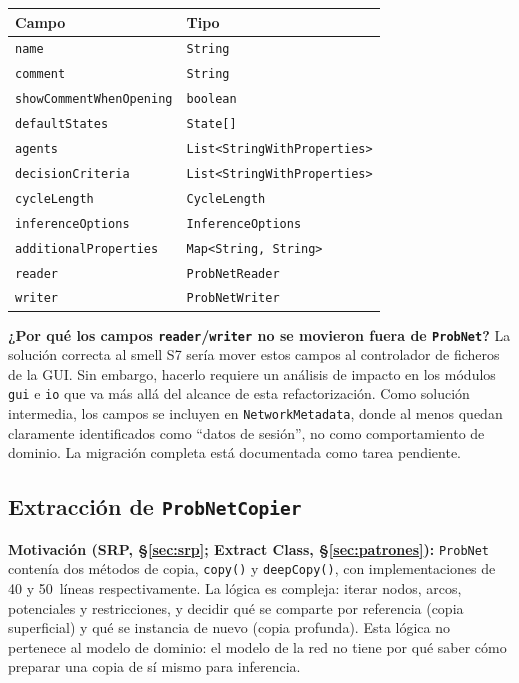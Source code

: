\documentclass[11pt,a4paper]{article}
\newcommand{\code}[1]{\texttt{#1}}
\begin{document}
\begin{center}
\begin{tabular}{ll}
\toprule
\textbf{Campo} & \textbf{Tipo} \\
\midrule
\code{name}                      & \code{String} \\
\code{comment}                   & \code{String} \\
\code{showCommentWhenOpening}    & \code{boolean} \\
\code{defaultStates}             & \code{State[]} \\
\code{agents}                    & \code{List<StringWithProperties>} \\
\code{decisionCriteria}          & \code{List<StringWithProperties>} \\
\code{cycleLength}               & \code{CycleLength} \\
\code{inferenceOptions}          & \code{InferenceOptions} \\
\code{additionalProperties}      & \code{Map<String, String>} \\
\code{reader}                    & \code{ProbNetReader} \\
\code{writer}                    & \code{ProbNetWriter} \\
\bottomrule
\end{tabular}
\end{center}

\begin{nota}
\textbf{¿Por qué los campos \code{reader}/\code{writer} no se movieron
fuera de \code{ProbNet}?}  La solución correcta al smell S7 sería mover
estos campos al controlador de ficheros de la GUI.  Sin embargo, hacerlo
requiere un análisis de impacto en los módulos \code{gui} e \code{io}
que va más allá del alcance de esta refactorización.  Como solución
intermedia, los campos se incluyen en \code{NetworkMetadata}, donde al
menos quedan claramente identificados como ``datos de sesión'', no como
comportamiento de dominio.  La migración completa está documentada como
tarea pendiente.
\end{nota}

\subsection{Extracción de \texttt{ProbNetCopier}}
\label{sec:copier}

\textbf{Motivación (SRP, §\ref{sec:srp}; Extract Class, §\ref{sec:patrones}):}
\code{ProbNet} contenía dos métodos de copia, \code{copy()} y
\code{deepCopy()}, con implementaciones de 40 y 50~líneas
respectivamente.  La lógica es compleja: iterar nodos, arcos, potenciales
y restricciones, y decidir qué se comparte por referencia (copia
superficial) y qué se instancia de nuevo (copia profunda).  Esta lógica
no pertenece al modelo de dominio: el modelo de la red no tiene por qué
saber cómo preparar una copia de sí mismo para inferencia.
\end{document}
